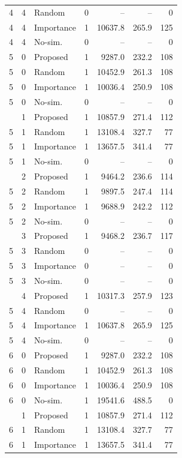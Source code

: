 \begin{table}[t]
\begin{tabular}{cc l c r r r}
4 & 4 & Random & 0 & -- & -- & 0 \\
4 & 4 & Importance & 1 & 10637.8 & 265.9 & 125 \\
4 & 4 & No-sim. & 0 & -- & -- & 0 \\
\midrule
5 & 0 & Proposed & 1 & 9287.0 & 232.2 & 108 \\
5 & 0 & Random & 1 & 10452.9 & 261.3 & 108 \\
5 & 0 & Importance & 1 & 10036.4 & 250.9 & 108 \\
5 & 0 & No-sim. & 0 & -- & -- & 0 \\
\addlinespace[1pt]
5 & 1 & Proposed & 1 & 10857.9 & 271.4 & 112 \\
5 & 1 & Random & 1 & 13108.4 & 327.7 & 77 \\
5 & 1 & Importance & 1 & 13657.5 & 341.4 & 77 \\
5 & 1 & No-sim. & 0 & -- & -- & 0 \\
\addlinespace[1pt]
5 & 2 & Proposed & 1 & 9464.2 & 236.6 & 114 \\
5 & 2 & Random & 1 & 9897.5 & 247.4 & 114 \\
5 & 2 & Importance & 1 & 9688.9 & 242.2 & 112 \\
5 & 2 & No-sim. & 0 & -- & -- & 0 \\
\addlinespace[1pt]
5 & 3 & Proposed & 1 & 9468.2 & 236.7 & 117 \\
5 & 3 & Random & 0 & -- & -- & 0 \\
5 & 3 & Importance & 0 & -- & -- & 0 \\
5 & 3 & No-sim. & 0 & -- & -- & 0 \\
\addlinespace[1pt]
5 & 4 & Proposed & 1 & 10317.3 & 257.9 & 123 \\
5 & 4 & Random & 0 & -- & -- & 0 \\
5 & 4 & Importance & 1 & 10637.8 & 265.9 & 125 \\
5 & 4 & No-sim. & 0 & -- & -- & 0 \\
\midrule
6 & 0 & Proposed & 1 & 9287.0 & 232.2 & 108 \\
6 & 0 & Random & 1 & 10452.9 & 261.3 & 108 \\
6 & 0 & Importance & 1 & 10036.4 & 250.9 & 108 \\
6 & 0 & No-sim. & 1 & 19541.6 & 488.5 & 0 \\
\addlinespace[1pt]
6 & 1 & Proposed & 1 & 10857.9 & 271.4 & 112 \\
6 & 1 & Random & 1 & 13108.4 & 327.7 & 77 \\
6 & 1 & Importance & 1 & 13657.5 & 341.4 & 77 \\

\end{tabular}
\end{table}

